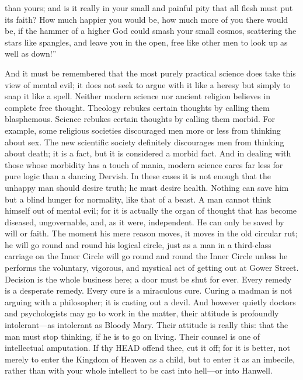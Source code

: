 than yours; and is it really in your small and painful pity that all flesh must put its faith? How much happier you would be, how much more of you there would be, if the hammer of a higher God could smash your small cosmos, scattering the stars like spangles, and leave you in the open, free like other men to look up as well as down!”

And it must be remembered that the most purely practical science does take this view of mental evil; it does not seek to argue with it like a heresy but simply to snap it like a spell. Neither modern science nor ancient religion believes in complete free thought. Theology rebukes certain thoughts by calling them blasphemous. Science rebukes certain thoughts by calling them morbid. For example, some religious societies discouraged men more or less from thinking about sex. The new scientific society definitely discourages men from thinking about death; it is a fact, but it is considered a morbid fact. And in dealing with those whose morbidity has a touch of mania, modern science cares far less for pure logic than a dancing Dervish. In these cases it is not enough that the unhappy man should desire truth; he must desire health. Nothing can save him but a blind hunger for normality, like that of a beast. A man cannot think himself out of mental evil; for it is actually the organ of thought that has become diseased, ungovernable, and, as it were, independent. He can only be saved by will or faith. The moment his mere reason moves, it moves in the old circular rut; he will go round and round his logical circle, just as a man in a third-class carriage on the Inner Circle will go round and round the Inner Circle unless he performs the voluntary, vigorous, and mystical act of getting out at Gower Street. Decision is the whole business here; a door must be shut for ever. Every remedy is a desperate remedy. Every cure is a miraculous cure. Curing a madman is not arguing with a philosopher; it is casting out a devil. And however quietly doctors and psychologists may go to work in the matter, their attitude is profoundly intolerant—as intolerant as Bloody Mary. Their attitude is really this: that the man must stop thinking, if he is to go on living. Their counsel is one of intellectual amputation. If thy HEAD offend thee, cut it off; for it is better, not merely to enter the Kingdom of Heaven as a child, but to enter it as an imbecile, rather than with your whole intellect to be cast into hell—or into Hanwell.

